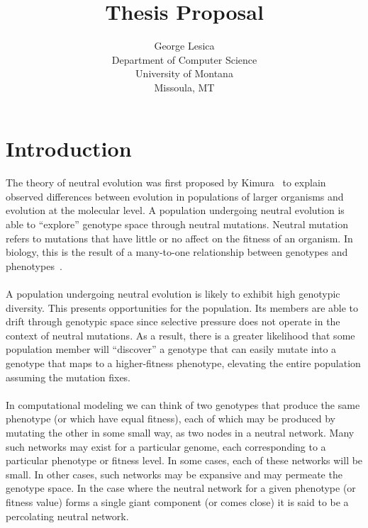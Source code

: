\documentclass[12pt,letterpaper,titlepage,draft]{article}
\title{Thesis Proposal}
\author{George Lesica\\
Department of Computer Science\\
University of Montana\\
Missoula, MT}
\begin{document}
\maketitle

\section{Introduction}

\paragraph{}
The theory of neutral evolution was first proposed by Kimura~\cite{Kimura1984}
to explain observed differences between evolution in populations of larger
organisms and evolution at the molecular level. A population undergoing
neutral evolution is able to ``explore'' genotype space through neutral
mutations. Neutral mutation refers to mutations that have little or no affect
on the fitness of an organism. In biology, this is the result of a many-to-one
relationship between genotypes and phenotypes~\cite{Newman1998}.

\paragraph{}
A population undergoing neutral evolution is likely to exhibit high genotypic
diversity. This presents opportunities for the population. Its members are able
to drift through genotypic space since selective pressure does not operate in
the context of neutral mutations. As a result, there is a greater likelihood
that some population member will ``discover'' a genotype that can easily mutate
into a genotype that maps to a higher-fitness phenotype, elevating the entire
population assuming the mutation fixes.

\paragraph{}
In computational modeling we can think of two genotypes that produce the same
phenotype (or which have equal fitness), each of which may be produced by
mutating the other in some small way, as two nodes in a neutral network. Many
such networks may exist for a particular genome, each corresponding to a
particular phenotype or fitness level. In some cases, each of these networks
will be small. In other cases, such networks may be expansive and may permeate
the genotype space. In the case where the neutral network for a given phenotype
(or fitness value) forms a single giant component (or comes close) it is said
to be a percolating neutral network.
\end{document}
